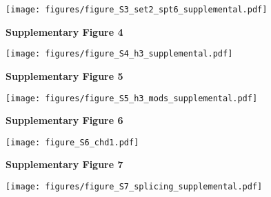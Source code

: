 \documentclass[9pt, letterpaper]{extarticle}
\begin{document}
{\centering \texttt{[image: figures/figure\_S3\_set2\_spt6\_supplemental.pdf]}\par}

\newpage

\textbf{\large Supplementary Figure 4}

{\centering \texttt{[image: figures/figure\_S4\_h3\_supplemental.pdf]}\par}

\newpage

\textbf{\large Supplementary Figure 5}

{\centering \texttt{[image: figures/figure\_S5\_h3\_mods\_supplemental.pdf]}\par}

\newpage

\textbf{\large Supplementary Figure 6}

{\centering \texttt{[image: figure\_S6\_chd1.pdf]}\par}

\newpage

\textbf{\large Supplementary Figure 7}

{\centering \texttt{[image: figures/figure\_S7\_splicing\_supplemental.pdf]}\par}

\newpage
\end{document}
